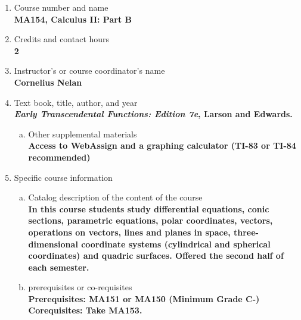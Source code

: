 \label{MA154}  %
\begin{enumerate}[1.]
\item Course number and name\\
  {\bfseries
    MA154, Calculus II: Part B
  }
  
\item Credits and contact hours\\
  {\bfseries
    2  %
  }

\item Instructor's or course coordinator's name\\
  {\bfseries
    Cornelius Nelan    
  }

\item Text book, title, author, and year\\
  {\bfseries
    {\em Early Transcendental Functions: Edition 7e}, Larson and Edwards.     
  }
\begin{enumerate}[a.]
\item Other supplemental materials\\
  {\bfseries
    Access to WebAssign and a graphing calculator (TI-83 or TI-84 recommended)
  }
\end{enumerate}

\item Specific course information
\begin{enumerate}[a.]  
\item Catalog description of the content of the course\\
  {\bfseries
In this course students study differential equations, conic sections, parametric equations, polar coordinates, vectors, operations on vectors, lines and planes in space, three-dimensional coordinate systems (cylindrical and spherical coordinates) and quadric surfaces. Offered the second half of each semester.
}

\item prerequisites or co-requisites\\
  {\bfseries
    Prerequisites: MA151 or MA150 (Minimum Grade C-)\\ %
    Corequisites: Take MA153.
  }


\end{enumerate}
\end{enumerate}
